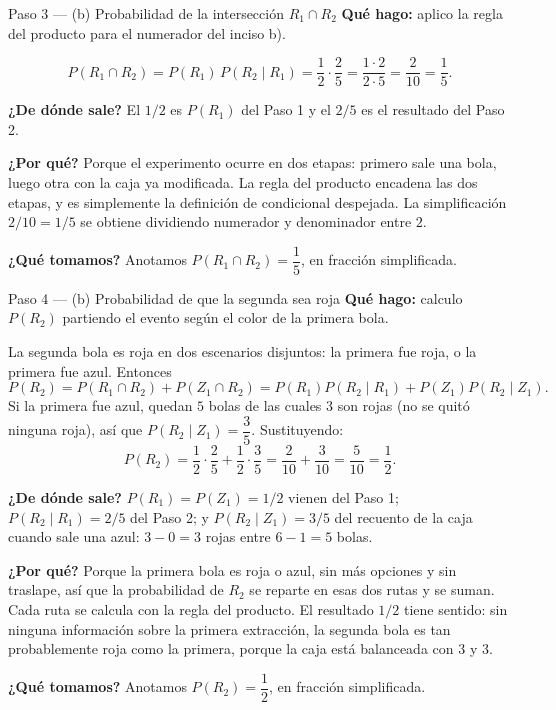 \documentclass[11pt]{article}
\begin{document}
\begin{paso}{Paso 3 --- (b) Probabilidad de la intersección $R_1\cap R_2$}
\textbf{Qué hago:} aplico la regla del producto para el numerador del inciso b).

\[
P(R_1\cap R_2)=P(R_1)\,P(R_2\mid R_1)=\frac{1}{2}\cdot\frac{2}{5}=\frac{1\cdot 2}{2\cdot 5}=\frac{2}{10}=\frac{1}{5}.
\]

\textbf{¿De dónde sale?} El $1/2$ es $P(R_1)$ del Paso 1 y el $2/5$ es el resultado del Paso 2.

\textbf{¿Por qué?} Porque el experimento ocurre en dos etapas: primero sale una bola, luego otra con la caja ya modificada. La regla del producto encadena las dos etapas, y es simplemente la definición de condicional despejada. La simplificación $2/10=1/5$ se obtiene dividiendo numerador y denominador entre $2$.

\textbf{¿Qué tomamos?} Anotamos $P(R_1\cap R_2)=\dfrac{1}{5}$, en fracción simplificada.
\end{paso}

\begin{paso}{Paso 4 --- (b) Probabilidad de que la segunda sea roja}
\textbf{Qué hago:} calculo $P(R_2)$ partiendo el evento según el color de la primera bola.

La segunda bola es roja en dos escenarios disjuntos: la primera fue roja, o la primera fue azul. Entonces
\[
P(R_2)=P(R_1\cap R_2)+P(Z_1\cap R_2)=P(R_1)P(R_2\mid R_1)+P(Z_1)P(R_2\mid Z_1).
\]
Si la primera fue azul, quedan $5$ bolas de las cuales $3$ son rojas (no se quitó ninguna roja), así que $P(R_2\mid Z_1)=\dfrac{3}{5}$. Sustituyendo:
\[
P(R_2)=\frac{1}{2}\cdot\frac{2}{5}+\frac{1}{2}\cdot\frac{3}{5}
=\frac{2}{10}+\frac{3}{10}
=\frac{5}{10}=\frac{1}{2}.
\]

\textbf{¿De dónde sale?} $P(R_1)=P(Z_1)=1/2$ vienen del Paso 1; $P(R_2\mid R_1)=2/5$ del Paso 2; y $P(R_2\mid Z_1)=3/5$ del recuento de la caja cuando sale una azul: $3-0=3$ rojas entre $6-1=5$ bolas.

\textbf{¿Por qué?} Porque la primera bola es roja o azul, sin más opciones y sin traslape, así que la probabilidad de $R_2$ se reparte en esas dos rutas y se suman. Cada ruta se calcula con la regla del producto. El resultado $1/2$ tiene sentido: sin ninguna información sobre la primera extracción, la segunda bola es tan probablemente roja como la primera, porque la caja está balanceada con $3$ y $3$.

\textbf{¿Qué tomamos?} Anotamos $P(R_2)=\dfrac{1}{2}$, en fracción simplificada.
\end{paso}
\end{document}
